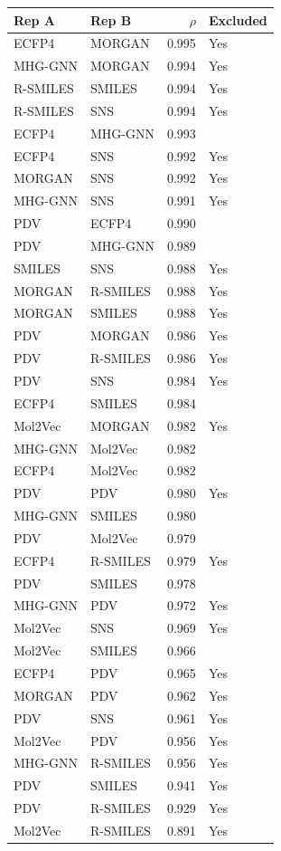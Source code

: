 \begin{tabular}{llrl}
\toprule
\textbf{Rep A} & \textbf{Rep B} & \textbf{$\rho$} & \textbf{Excluded} \\
\midrule
ECFP4 & MORGAN & 0.995 & Yes \\
MHG-GNN & MORGAN & 0.994 & Yes \\
R-SMILES & SMILES & 0.994 & Yes \\
R-SMILES & SNS & 0.994 & Yes \\
ECFP4 & MHG-GNN & 0.993 &  \\
ECFP4 & SNS & 0.992 & Yes \\
MORGAN & SNS & 0.992 & Yes \\
MHG-GNN & SNS & 0.991 & Yes \\
PDV & ECFP4 & 0.990 &  \\
PDV & MHG-GNN & 0.989 &  \\
SMILES & SNS & 0.988 & Yes \\
MORGAN & R-SMILES & 0.988 & Yes \\
MORGAN & SMILES & 0.988 & Yes \\
PDV & MORGAN & 0.986 & Yes \\
PDV & R-SMILES & 0.986 & Yes \\
PDV & SNS & 0.984 & Yes \\
ECFP4 & SMILES & 0.984 &  \\
Mol2Vec & MORGAN & 0.982 & Yes \\
MHG-GNN & Mol2Vec & 0.982 &  \\
ECFP4 & Mol2Vec & 0.982 &  \\
PDV & PDV & 0.980 & Yes \\
MHG-GNN & SMILES & 0.980 &  \\
PDV & Mol2Vec & 0.979 &  \\
ECFP4 & R-SMILES & 0.979 & Yes \\
PDV & SMILES & 0.978 &  \\
MHG-GNN & PDV & 0.972 & Yes \\
Mol2Vec & SNS & 0.969 & Yes \\
Mol2Vec & SMILES & 0.966 &  \\
ECFP4 & PDV & 0.965 & Yes \\
MORGAN & PDV & 0.962 & Yes \\
PDV & SNS & 0.961 & Yes \\
Mol2Vec & PDV & 0.956 & Yes \\
MHG-GNN & R-SMILES & 0.956 & Yes \\
PDV & SMILES & 0.941 & Yes \\
PDV & R-SMILES & 0.929 & Yes \\
Mol2Vec & R-SMILES & 0.891 & Yes \\
\bottomrule
\end{tabular}